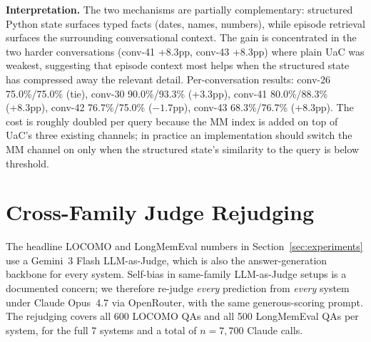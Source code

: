 \textbf{Interpretation.} The two mechanisms are partially complementary: structured Python state surfaces typed facts (dates, names, numbers), while episode retrieval surfaces the surrounding conversational context. The gain is concentrated in the two harder conversations (conv-41 +8.3pp, conv-43 +8.3pp) where plain UaC was weakest, suggesting that episode context most helps when the structured state has compressed away the relevant detail. Per-conversation results: conv-26 75.0\%/75.0\% (tie), conv-30 90.0\%/93.3\% (+3.3pp), conv-41 80.0\%/88.3\% (+8.3pp), conv-42 76.7\%/75.0\% ($-1.7$pp), conv-43 68.3\%/76.7\% (+8.3pp). The cost is roughly doubled per query because the MM index is added on top of UaC's three existing channels; in practice an implementation should switch the MM channel on only when the structured state's similarity to the query is below threshold.


\section{Cross-Family Judge Rejudging}
\label{sec:judge-check}

The headline LOCOMO and LongMemEval numbers in Section~\ref{sec:experiments} use a Gemini~3 Flash LLM-as-Judge, which is also the answer-generation backbone for every system. Self-bias in same-family LLM-as-Judge setups is a documented concern; we therefore re-judge \emph{every} prediction from \emph{every} system under Claude Opus~4.7 via OpenRouter, with the same generous-scoring prompt. The rejudging covers all 600 LOCOMO QAs and all 500 LongMemEval QAs per system, for the full 7 systems and a total of $n{=}7{,}700$ Claude calls.

